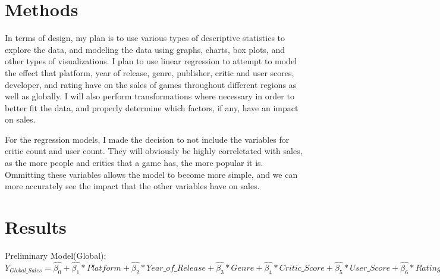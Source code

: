 \documentclass[12pt]{article}
\begin{document}
\section{Methods}
\label{sec:meth}
In terms of design, my plan is to use various types of descriptive statistics to explore the data, and modeling the data using graphs, 
charts, box plots, and other types of visualizations. I plan to use linear regression to attempt to model the effect that platform, 
year of release, genre, publisher, critic and user scores, developer, and rating have on the sales of games throughout different regions 
as well as globally. I will also perform transformations where necessary in order to better fit the data, and properly determine which 
factors, if any, have an impact on sales.

For the regression models, I made the decision to not include the variables for critic count and user count. 
They will obviously be highly correletated with sales, as the more people and critics that a game has, the more popular it is.
Ommitting these variables allows the model to become more simple, and we can more accurately see the impact that the other
variables have on sales.

\section{Results}
\label{sec:resu}
Preliminary Model(Global):
$Y_{Global\_Sales}=\hat{\beta_{0}}+\hat{\beta_{1}}*Platform+\hat{\beta_{2}}*Year\_of\_Release+\hat{\beta_{3}}*Genre+\hat{\beta_{4}}*Critic\_Score+\hat{\beta_{5}}*User\_Score+\hat{\beta_{6}}*Rating$
\end{document}
